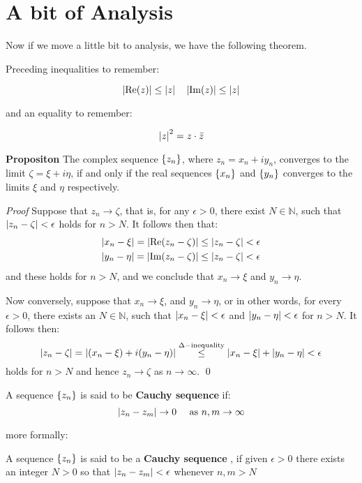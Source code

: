 \section*{A bit of Analysis}
Now if we move a little bit to analysis, we have the following theorem.

Preceding inequalities to remember:

\[ \left| \operatorname{Re}(z) \right| \leq \left| z \right| \quad \left| \operatorname{Im}(z) \right| \leq \left| z \right| \]

and an equality to remember:

\[ \left| z \right|^2 = z \cdot \bar{z} \]

\textbf{Propositon} The complex sequence $ \left\lbrace z_n \right\rbrace $, where $ z_n = x_n + iy_n $, converges to the limit $ \zeta = \xi + i\eta $, if and only if the real sequences $ \left\lbrace x_n \right\rbrace  $ and $ \left\lbrace y_n \right\rbrace $ converges to the limits $ \xi $ and $ \eta $ respectively.

\textit{Proof} Suppose that $ z_n \rightarrow \zeta  $, that is, for any $ \epsilon > 0 $, there exist $ N \in \mathbb{N} $, such that $ \left| z_n - \zeta \right|<\epsilon $ holds for $ n > N$. It follows then that:
\begin{align*}
\left| x_n - \xi \right| = \left| \operatorname{Re}(z_n - \zeta) \right| \leq \left| z_n - \zeta \right| < \epsilon \\
\left| y_n - \eta \right| = \left| \operatorname{Im}(z_n - \zeta) \right| \leq \left| z_n - \zeta \right| < \epsilon
\end{align*}
and these holds for $n > N $, and we conclude that $ x_n \rightarrow \xi $ and $ y_n \rightarrow \eta $.

Now conversely, suppose that $ x_n \rightarrow \xi $, and $ y_n \rightarrow \eta $, or in other words, for every $ \epsilon > 0 $, there exists an $ N \in \mathbb{N} $, such that $ \left| x_n - \xi \right| < \epsilon $ and $ \left| y_n - \eta \right| < \epsilon $ for $ n > N $. It follows then:
\[ \left| z_n - \zeta \right| = \left| (x_n - \xi) + i(y_n - \eta) \right| \overset{\Delta-\textrm{inequality}}{\leq} \left| x_n - \xi \right| + \left| y_n - \eta \right| < \epsilon \]
holds for $ n > N $ and hence $ z_n \rightarrow \zeta $ as $ n \rightarrow \infty $. \qed

A sequence $ \left\lbrace z_n \right\rbrace $ is said to be \textbf{Cauchy sequence} if:
\[ \left| z_n - z_m \right| \rightarrow 0 \quad \textrm{ as } n,m \rightarrow \infty  \]

more formally:
\begin{define}
	A sequence $ \left\lbrace z_n \right\rbrace $ is said to be a \textbf{Cauchy sequence }, if given $ \epsilon > 0 $ there exists an integer $ N > 0 $ so that $ \left| z_n - z_m \right| < \epsilon $ whenever $ n,m > N $
\end{define}

